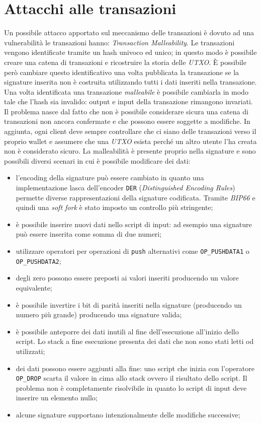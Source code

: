 \section{Attacchi alle transazioni}
Un possibile attacco apportato sul meccanismo delle transazioni è dovuto ad una vulnerabilità le transazioni hanno: \textit{Transaction Malleability}.\newline
Le transazioni vengono identificate tramite un hash univoco ed unico; in questo modo è possibile creare una catena di transazioni e ricostruire la storia delle \textit{UTXO}. È possibile però cambiare questo identificativo una volta pubblicata la transazione se la signature inserita non è costruita utilizzando tutti i dati inseriti nella transazione. Una volta identificata una transazione \textit{malleabile} è possibile cambiarla in modo tale che l'hash sia invalido: output e input della transazione rimangono invariati. Il problema nasce dal fatto che non è possibile considerare sicura una catena di transazioni non ancora confermate e che possono essere soggette a modifiche. In aggiunta, ogni client deve sempre controllare che ci siano delle transazioni verso il proprio wallet e assumere che una \textit{UTXO} esista perché un altro utente l'ha creata non è considerato sicuro.\newline
La malleabilità è presente proprio nella signature e sono possibili diversi scenari in cui è possibile modificare dei dati:
\begin{itemize}
    \item l'encoding della signature può essere cambiato in quanto una implementazione lasca dell'encoder \texttt{DER} (\textit{Distinguished Encoding Rules}) permette diverse rappresentazioni della signature codificata. Tramite \textit{BIP66} e quindi una \textit{soft fork} è stato imposto un controllo più stringente;
    \item è possibile inserire nuovi dati nello script di input: ad esempio una signature può essere inserita come somma di due numeri;
    \item utilizzare operatori per operazioni di \texttt{push} alternativi come \texttt{OP\_PUSHDATA1} o \texttt{OP\_PUSHDATA2};
    \item degli zero possono essere preposti ai valori inseriti producendo un valore equivalente;
    \item è possibile invertire i bit di parità inseriti nella signature (producendo un numero più grande) producendo una signature valida;
    \item è possibile anteporre dei dati inutili al fine dell'esecuzione all'inizio dello script. Lo stack a fine esecuzione presenta dei dati che non sono stati letti od utilizzati;
    \item dei dati possono essere aggiunti alla fine: uno script che inizia con l'operatore \texttt{OP\_DROP} scarta il valore in cima allo stack ovvero il risultato dello script. Il problema non è completamente risolvibile in quanto lo script di input deve inserire un elemento nullo;
    \item alcune signature supportano intenzionalmente delle modifiche successive;
\end{itemize}
